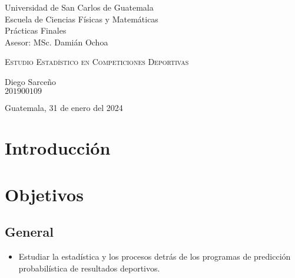 \begin{titlepage}


\begin{flushleft}
    Universidad de San Carlos de Guatemala \\
    Escuela de Ciencias Físicas y Matemáticas \\
    Prácticas Finales \\
    Asesor: MSc. Damián Ochoa
\end{flushleft}

\vspace{7.5cm}

\begin{center}
    \huge{\textsc{Estudio Estadístico en Competiciones Deportivas}} \\[1cm]
\end{center}

\vspace{7.5cm}

\begin{flushright}
    Diego Sarceño \\
    $201900109$
\end{flushright}

\vspace{1cm}

\begin{center}
    Guatemala, 31 de enero del 2024
\end{center}

\end{titlepage}



%


\section{Introducción}





\section{Objetivos}
\subsection{General}
\begin{itemize}
	\item Estudiar la estadística y los procesos detrás de los programas de predicción probabilística de resultados deportivos.
\end{itemize}

